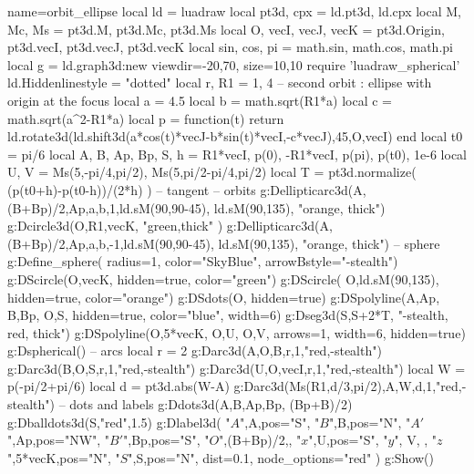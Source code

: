 \documentclass{standalone}
\begin{document}
\begin{luadraw}{name=orbit_ellipse}
local ld = luadraw
local pt3d, cpx = ld.pt3d, ld.cpx
local M, Mc, Ms = pt3d.M, pt3d.Mc, pt3d.Ms
local O, vecI, vecJ, vecK = pt3d.Origin, pt3d.vecI, pt3d.vecJ, pt3d.vecK
local sin, cos, pi = math.sin, math.cos, math.pi
local g = ld.graph3d:new{ viewdir={-20,70}, size={10,10} }
require 'luadraw_spherical'
ld.Hiddenlinestyle = "dotted"
local r, R1 = 1, 4
-- second orbit : ellipse with origin at the focus
local a = 4.5
local b = math.sqrt(R1*a)
local c = math.sqrt(a^2-R1*a)
local  p = function(t) return ld.rotate3d(ld.shift3d(a*cos(t)*vecJ-b*sin(t)*vecI,-c*vecJ),45,{O,vecI}) end
local t0 = pi/6
local A, B, Ap, Bp, S, h = R1*vecI, p(0), -R1*vecI, p(pi), p(t0), 1e-6
local U, V = Ms(5,-pi/4,pi/2), Ms(5,pi/2-pi/4,pi/2)    
local T = pt3d.normalize( (p(t0+h)-p(t0-h))/(2*h) ) -- tangent
-- orbits
g:Dellipticarc3d(A,(B+Bp)/2,Ap,a,b,1,ld.sM(90,90-45), ld.sM(90,135), "orange, thick")
g:Dcircle3d(O,R1,vecK, "green,thick" )
g:Dellipticarc3d(A,(B+Bp)/2,Ap,a,b,-1,ld.sM(90,90-45), ld.sM(90,135), "orange, thick")
-- sphere
g:Define_sphere( {radius=1, color="SkyBlue", arrowBstyle="-stealth"})
g:DScircle({O,vecK}, {hidden=true, color="green"})
g:DScircle( {O,ld.sM(90,135)}, {hidden=true, color="orange"})
 g:DSdots(O, {hidden=true})
g:DSpolyline({{A,Ap}, {B,Bp}, {O,S}}, {hidden=true, color="blue", width=6})
g:Dseg3d({S,S+2*T}, "-stealth, red, thick")
g:DSpolyline({{O,5*vecK}, {O,U}, {O,V}}, {arrows=1, width=6, hidden=true})
g:Dspherical()
-- arcs
local r = 2
g:Darc3d(A,O,B,r,1,"red,-stealth")
g:Darc3d(B,O,S,r,1,"red,-stealth")
g:Darc3d(U,O,vecI,r,1,"red,-stealth")
local W = p(-pi/2+pi/6)
local d = pt3d.abs(W-A)
g:Darc3d(Ms(R1,d/3,pi/2),A,W,d,1,"red,-stealth") 
-- dots and labels   
g:Ddots3d({A,B,Ap,Bp, (Bp+B)/2})
g:Dballdots3d(S,"red",1.5)
g:Dlabel3d( "$A$",A,{pos="S"}, "$B$",B,{pos="N"}, "$A'$",Ap,{pos="NW"},
    "$B'$",Bp,{pos="S"}, "$O$",(B+Bp)/2,{}, "$x$",U,{pos="S"}, "$y$", V, {}, "$z$",5*vecK,{pos="N"}, 
    "$S$",S,{pos="N", dist=0.1, node_options="red"} )
g:Show()
\end{luadraw}
\end{document}
